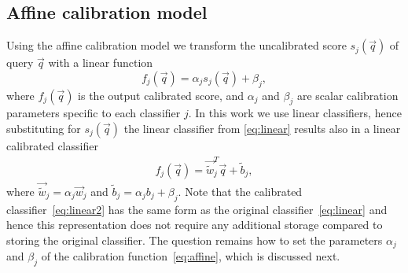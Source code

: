   \subsection{Affine calibration model}
   Using the affine calibration model we transform the uncalibrated score $s_j(\vec{q})$ of query $\vec{q}$ with a linear function 
     \begin{equation}
       f_j(\vec{q}) = \alpha_j s_j(\vec{q}) + \beta_j,
       \label{eq:affine}
     \end{equation}
	where 
	$ f_j(\vec{q})$ is the output calibrated score, and
	$\alpha_j$ and $\beta_j$ are scalar calibration parameters specific to each classifier $j$.
	In this work we use linear classifiers, hence substituting for $s_j(\vec{q})$ %
	the linear classifier from \eqref{eq:linear} results also in a linear calibrated classifier
    \begin{align}
    \label{eq:linear2}
        f_j(\vec{q}) = \vec{\widetilde{w}}_j^T \vec{q} + \widetilde{b}_j,
     \end{align}
  where $\vec{\widetilde{w}}_j = \alpha_j\vec{w}_j$ and $\widetilde{b}_j=\alpha_j b_j+\beta_j$. 
  Note that the calibrated classifier~\eqref{eq:linear2} has the same form as the original classifier~\eqref{eq:linear} and hence this representation does not require any additional storage compared to storing the original classifier. %
  The question remains how to set the parameters $\alpha_j$ and $\beta_j$ of the calibration function~\eqref{eq:affine}, which is discussed next.


